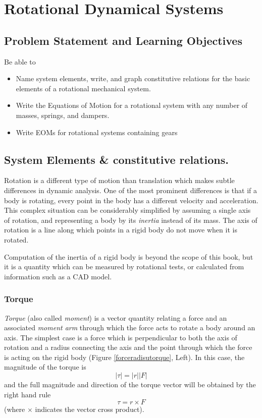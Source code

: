 %
%
%


\chapter{Rotational Dynamical Systems}

\section{Problem Statement and Learning Objectives}
Be able to
\begin{itemize}
  \item Name system elements, write, and graph constitutive relations for the basic elements
  of a rotational mechanical system.
  \item Write the Equations of Motion for a rotational system with any number of masses, springs, and dampers.
  \item Write EOMs for rotational systems containing gears
\end{itemize}

\section{System Elements \& constitutive relations.}

Rotation is a different type of motion than translation which  makes subtle differences in dynamic analysis.   One of the most prominent differences is that if a body is rotating, every point in the body has a different velocity and acceleration.   This complex situation can be considerably simplified by assuming a single axis of rotation, and representing a body by its {\it inertia} instead of its mass.   The axis of rotation is a line along which points in a rigid body do not move when it is rotated.

Computation of the inertia of a rigid body is beyond the scope of this book, but it is a quantity which can be measured by rotational tests, or calculated from information such as a CAD model.

\subsection{Torque}

{\it Torque} (also called {\it moment}) is a vector quantity relating a force and an associated {\it moment arm} through which the force acts to rotate a body around an axis.   The simplest case is a force which is perpendicular to both the axis of rotation and a radius connecting the axis and the point through which the force is acting on the rigid body (Figure \ref{forceradisutorque}, Left). In this case, the magnitude of the torque is
\[
|\tau| = |r||F|
\]
and the full magnitude and direction of the torque vector will be obtained by the right hand rule
\[
\tau = r \times F
\]
(where $\times$ indicates the vector cross product).

